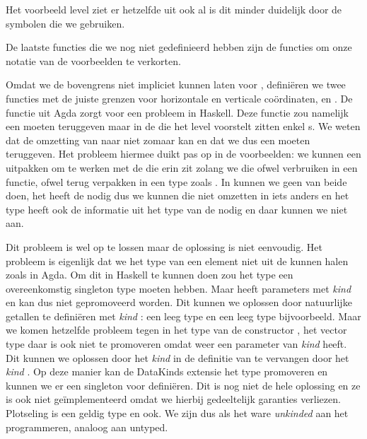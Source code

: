 
Het voorbeeld level ziet er hetzelfde uit ook al is dit minder duidelijk door
de symbolen die we gebruiken.


De laatste functies die we nog niet gedefinieerd hebben zijn de functies om
onze notatie van de voorbeelden te verkorten.


Omdat we de bovengrens niet impliciet kunnen laten voor ,
definiëren we twee functies met de juiste grenzen voor horizontale en verticale
coördinaten,  en . De  functie uit Agda zorgt voor
een probleem in Haskell. Deze functie zou namelijk een 
moeten teruggeven maar in de  die het level voorstelt zitten
enkel s. We weten dat de omzetting van  naar
 niet zomaar kan en dat we dus een  moeten
teruggeven. Het probleem hiermee duikt pas op in de voorbeelden: we kunnen een
 uitpakken om te werken met de  die erin
zit zolang we die  ofwel verbruiken in een functie, ofwel
terug verpakken in een type zoals . In  kunnen we
geen van beide doen, het  heeft de  nodig dus we
kunnen die niet omzetten in iets anders en het type  heeft ook de
informatie uit het type van de  nodig en daar kunnen we niet
aan.

Dit probleem is wel op te lossen maar de oplossing is niet eenvoudig. Het
probleem is eigenlijk dat we het type van een element niet uit de
 kunnen halen zoals in Agda. Om dit in Haskell te kunnen doen zou
het type  een overeenkomstig singleton type moeten hebben. Maar
 heeft parameters met \emph{kind}  en kan dus niet
gepromoveerd worden. Dit kunnen we oplossen door natuurlijke getallen te
definiëren met \emph{kind} \ihask{*}: een leeg type  en een leeg type
 bijvoorbeeld. Maar we komen hetzelfde probleem tegen in het type
van de constructor , het vector type daar is ook niet te promoveren
omdat  weer een parameter van \emph{kind}  heeft. Dit kunnen we
oplossen door het \emph{kind}  in de definitie van  te vervangen
door het \emph{kind} \ihask{*}. Op deze manier kan de DataKinds extensie het
 type promoveren en kunnen we er een singleton voor definiëren.
Dit is nog niet de hele oplossing en ze is ook niet geïmplementeerd omdat we
hierbij gedeeltelijk garanties verliezen. Plotseling is  een
geldig type en  ook. We zijn dus als het ware \emph{unkinded}
aan het programmeren, analoog aan untyped.

